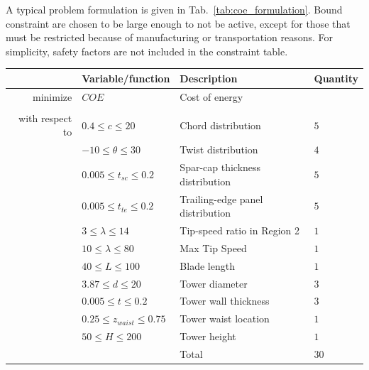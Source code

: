 \documentclass[]{aiaa-tc} %
\begin{document}
    A typical problem formulation is given in Tab.~\ref{tab:coe_formulation}.  Bound constraint are chosen to be large enough to not be active, except for those that must be restricted because of manufacturing or transportation reasons.  For simplicity, safety factors are not included in the constraint table.


    \begin{table}
        \centering
        \begin{tabular}{r l l l}
            \hline
            & Variable/function & Description & Quantity \\
            \hline
            minimize            & $COE$ & Cost of energy \\
            \\
            with respect to & $0.4 \le c \le 20$ & Chord distribution & $5$ \\
                                    & $-10 \le \theta \le 30$ & Twist distribution & $4$ \\
                                    & $0.005 \le t_{sc} \le 0.2$ & Spar-cap thickness distribution & $5$ \\
                                    & $0.005 \le t_{te} \le 0.2$ & Trailing-edge panel distribution & $5$ \\
                                    & $3 \le \lambda \le 14$ & Tip-speed ratio in Region 2 & $1$ \\
                                    & $10 \le \lambda \le 80$ & Max Tip Speed & $1$ \\
                                    & $40 \le L \le 100$ & Blade length & $1$ \\
                                    & $3.87 \le d \le 20$ & Tower diameter & $3$ \\
                                    & $0.005 \le t \le 0.2$ & Tower wall thickness & $3$ \\
                                    & $0.25 \le z_{waist} \le 0.75$ & Tower waist location & $1$ \\
                                    & $50 \le H \le 200$ & Tower height & $1$ \\
                                    & & Total & $30$ \\


\end{tabular}
\end{table}
\end{document}

